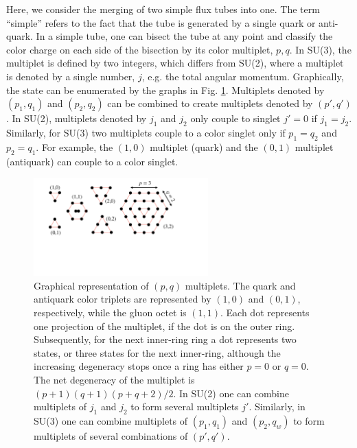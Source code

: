 \documentclass[aps, prc, 12pt, nofootinbib, showpacs, superscriptaddress, tightenlines, groupedaddress]{revtex4-2}
\begin{document}
Here, we consider the merging of two simple flux tubes into one. The term ``simple'' refers to the fact that the tube is generated by a single quark or anti-quark. In a simple tube, one can bisect the tube at any point and classify the color charge on each side of the bisection by its color multiplet, $p,q$. In SU(3), the multiplet is defined by two integers, which differs from SU(2), where a multiplet is denoted by a single number, $j$, e.g. the total angular momentum. Graphically, the state can be enumerated by the graphs in Fig. \ref{fig:pqmultiplet}. Multiplets denoted by $(p_1,q_1)$ and $(p_2,q_2)$ can be combined to create multiplets denoted by $(p',q')$. In SU(2), multiplets denoted by $j_1$ and $j_2$ only couple to singlet $j'=0$ if $j_1=j_2$. Similarly, for SU(3) two multiplets couple to a color singlet only if $p_1=q_2$ and $p_2=q_1$. For example, the $(1,0)$ multiplet (quark) and the $(0,1)$ multiplet (antiquark) can couple to a color singlet.
\begin{figure}
\centerline{\includegraphics[width=0.6\textwidth]{figs/pqmultiplet.pdf}}
\caption{\label{fig:pqmultiplet}
Graphical representation of $(p,q)$ multiplets. The quark and antiquark color{} triplets are represented by $(1,0)$ and $(0,1)$, respectively, while the gluon octet is $(1,1)$. Each dot represents one projection of the multiplet, if the dot is on the outer ring. Subsequently, for the next inner-ring ring a dot represents two states, or three states for the next inner-ring, although the increasing degeneracy stops once a ring has either $p=0$ or $q=0$. The net degeneracy of the multiplet is $(p+1)(q+1)(p+q+2)/2$. In SU(2) one can combine multiplets of $j_1$ and $j_2$ to form several multiplets $j'$. Similarly, in SU(3) one can combine multiplets of $(p_1,q_1)$ and $(p_2,q_w)$ to form multiplets of several combinations of $(p',q')$.
}
\end{figure}
\end{document}
